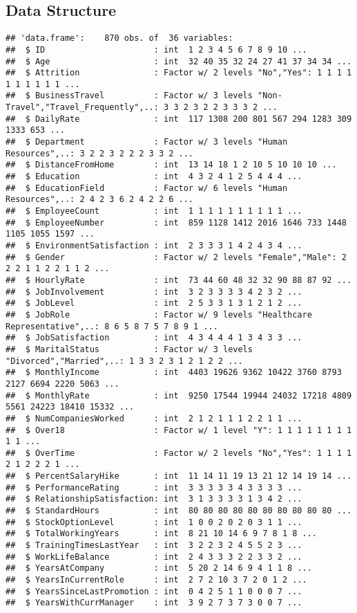 \documentclass[]{article}
\begin{document}
\hypertarget{data-structure}{%
\subsection{Data Structure}\label{data-structure}}

\begin{verbatim}
## 'data.frame':    870 obs. of  36 variables:
##  $ ID                      : int  1 2 3 4 5 6 7 8 9 10 ...
##  $ Age                     : int  32 40 35 32 24 27 41 37 34 34 ...
##  $ Attrition               : Factor w/ 2 levels "No","Yes": 1 1 1 1 1 1 1 1 1 1 ...
##  $ BusinessTravel          : Factor w/ 3 levels "Non-Travel","Travel_Frequently",..: 3 3 2 3 2 2 3 3 3 2 ...
##  $ DailyRate               : int  117 1308 200 801 567 294 1283 309 1333 653 ...
##  $ Department              : Factor w/ 3 levels "Human Resources",..: 3 2 2 3 2 2 2 3 3 2 ...
##  $ DistanceFromHome        : int  13 14 18 1 2 10 5 10 10 10 ...
##  $ Education               : int  4 3 2 4 1 2 5 4 4 4 ...
##  $ EducationField          : Factor w/ 6 levels "Human Resources",..: 2 4 2 3 6 2 4 2 2 6 ...
##  $ EmployeeCount           : int  1 1 1 1 1 1 1 1 1 1 ...
##  $ EmployeeNumber          : int  859 1128 1412 2016 1646 733 1448 1105 1055 1597 ...
##  $ EnvironmentSatisfaction : int  2 3 3 3 1 4 2 4 3 4 ...
##  $ Gender                  : Factor w/ 2 levels "Female","Male": 2 2 2 1 1 2 2 1 1 2 ...
##  $ HourlyRate              : int  73 44 60 48 32 32 90 88 87 92 ...
##  $ JobInvolvement          : int  3 2 3 3 3 3 4 2 3 2 ...
##  $ JobLevel                : int  2 5 3 3 1 3 1 2 1 2 ...
##  $ JobRole                 : Factor w/ 9 levels "Healthcare Representative",..: 8 6 5 8 7 5 7 8 9 1 ...
##  $ JobSatisfaction         : int  4 3 4 4 4 1 3 4 3 3 ...
##  $ MaritalStatus           : Factor w/ 3 levels "Divorced","Married",..: 1 3 3 2 3 1 2 1 2 2 ...
##  $ MonthlyIncome           : int  4403 19626 9362 10422 3760 8793 2127 6694 2220 5063 ...
##  $ MonthlyRate             : int  9250 17544 19944 24032 17218 4809 5561 24223 18410 15332 ...
##  $ NumCompaniesWorked      : int  2 1 2 1 1 1 2 2 1 1 ...
##  $ Over18                  : Factor w/ 1 level "Y": 1 1 1 1 1 1 1 1 1 1 ...
##  $ OverTime                : Factor w/ 2 levels "No","Yes": 1 1 1 1 2 1 2 2 2 1 ...
##  $ PercentSalaryHike       : int  11 14 11 19 13 21 12 14 19 14 ...
##  $ PerformanceRating       : int  3 3 3 3 3 4 3 3 3 3 ...
##  $ RelationshipSatisfaction: int  3 1 3 3 3 3 1 3 4 2 ...
##  $ StandardHours           : int  80 80 80 80 80 80 80 80 80 80 ...
##  $ StockOptionLevel        : int  1 0 0 2 0 2 0 3 1 1 ...
##  $ TotalWorkingYears       : int  8 21 10 14 6 9 7 8 1 8 ...
##  $ TrainingTimesLastYear   : int  3 2 2 3 2 4 5 5 2 3 ...
##  $ WorkLifeBalance         : int  2 4 3 3 3 2 2 3 3 2 ...
##  $ YearsAtCompany          : int  5 20 2 14 6 9 4 1 1 8 ...
##  $ YearsInCurrentRole      : int  2 7 2 10 3 7 2 0 1 2 ...
##  $ YearsSinceLastPromotion : int  0 4 2 5 1 1 0 0 0 7 ...
##  $ YearsWithCurrManager    : int  3 9 2 7 3 7 3 0 0 7 ...
\end{verbatim}
\end{document}
